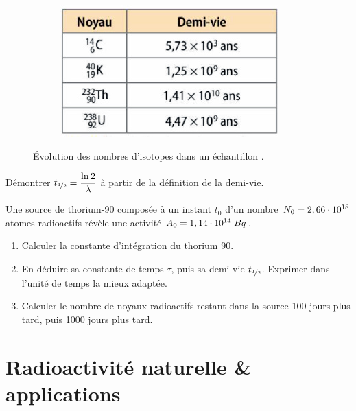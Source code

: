 \documentclass[11pt,a4paper]{article}
\begin{document}
\begin{figure}[H]
\begin{subfigure}{.32\textwidth}
\end{subfigure}
\begin{subfigure}{.32\textwidth}
  \centering
  \includegraphics[width=.95\linewidth]{imgs/p8/demiviesexe.jpg}  
\end{subfigure}
\caption{Évolution des nombres d'isotopes dans un échantillon .}
\end{figure}

\begin{exo}
Démontrer $t_{\nicefrac{1}{2}} = \dfrac{\ln{2}}{\lambda}$ à partir de la définition de la demi-vie. 
\vspace{4cm}
\end{exo}

\begin{exo}
Une source de thorium-90 composée à un instant $t_0$ d'un nombre $N_0 = 2,66\cdot10^{18}$ atomes radioactifs révèle une activité $A_0 = 1,14\cdot10^{14}\;Bq$. 
\begin{enumerate}
    \item Calculer la constante d'intégration du thorium 90. 
    \item En déduire sa constante de temps $\tau$, puis sa demi-vie $t_{\nicefrac{1}{2}}$.  Exprimer dans l'unité de temps la mieux adaptée.
    \item Calculer le nombre de noyaux radioactifs restant dans la source 100 jours plus tard, puis 1000 jours plus tard.
\end{enumerate}
\vspace{5cm}
\end{exo}




\section{Radioactivité naturelle \& applications}  
\end{document}
